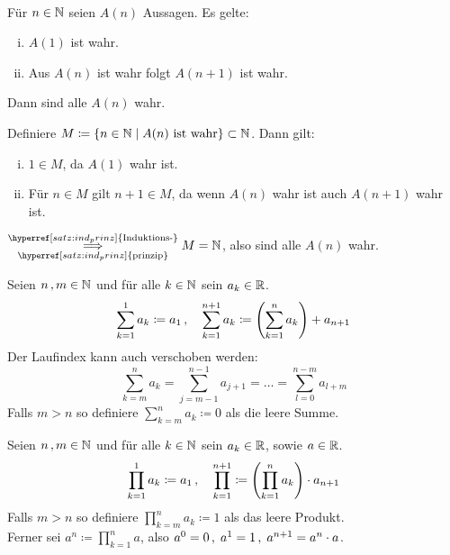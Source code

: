 \documentclass[../ana1.tex]{subfiles}
\begin{document}
\begin{kor}\label{satz:vollst_ind}\leavevmode \\
	Für \(n \in \mathbb{N} \) seien \(A(n) \) Aussagen. Es gelte:
	\begin{enumerate}[(i)]
		\item \(A(1) \) ist wahr.
		\item Aus \(A(n) \) ist wahr folgt \(A(n+1) \) ist wahr.
	\end{enumerate}
	Dann sind alle \(A(n) \) wahr.
\end{kor}
\begin{bew}
	Definiere \(M \coloneqq \{n \in \mathbb{N}  \; \vert  \; A(n) \text{ ist wahr}\} \subset \mathbb{N} \). Dann gilt:
	\begin{enumerate}[(i)]
		\item \(1\in M \), da \(A(1) \) wahr ist.
		\item Für \(n\in M \) gilt \(n + 1 \in M \), da wenn \(A(n) \) wahr ist auch \(A(n + 1) \) wahr ist.
	\end{enumerate}
	\(\overunderset{\hyperref[satz:ind_prinz]{\text{Induktions-}}}{\hyperref[satz:ind_prinz]{\text{prinzip}}}{\implies} M = \N \), also sind alle \(A(n) \) wahr.
\end{bew}

\begin{defi*}[Summen]Seien \(n \operatorname{,} m \in \mathbb{N} \) und für alle \(k \in \mathbb{N} \) sein \(a_{k} \in \mathbb{R} \).
	\[\sum_{k = 1}^{1} a_{k} \coloneqq a_{1} \operatorname{,} \quad \sum_{k = 1}^{n + 1} a_{k} \coloneqq \left(\sum_{k = 1}^{n} a_{k} \right) + a_{n + 1} \]
	Der Laufindex kann auch verschoben werden:
	\[\sum_{k = m}^{n} a_{k} = \sum_{j = m - 1}^{n - 1} a_{j + 1} = \ldots = \sum_{l = 0}^{n - m} a_{l + m} \]
	Falls \(m > n \) so definiere \(\sum_{k = m}^{n} a_{k} \coloneqq 0 \) als die leere Summe.
\end{defi*}

\begin{defi*}[Produkte]Seien \(n \operatorname{,} m \in \mathbb{N} \) und für alle \(k \in \mathbb{N} \) sein \(a_{k} \in \mathbb{R} \), sowie \(a \in \mathbb{R} \).
	\[\prod_{k = 1}^{1} a_{k} \coloneqq a_{1} \operatorname{,} \quad \prod_{k = 1}^{n + 1} \coloneqq \left(\prod_{k = 1}^{n} a_{k} \right) \cdot a_{n + 1} \]
	Falls \(m > n \) so definiere \(\prod_{k = m}^{n} a_{k} \coloneqq 1 \) als das leere Produkt. \\
	Ferner sei \(a^{n} \coloneqq \prod_{k = 1}^{n} a \), also \(a^{0} = 0 \operatorname{,}  \; a^{1} = 1 \operatorname{,}  \; a^{n + 1} = a^{n} \cdot a \).
\end{defi*}
\end{document}
